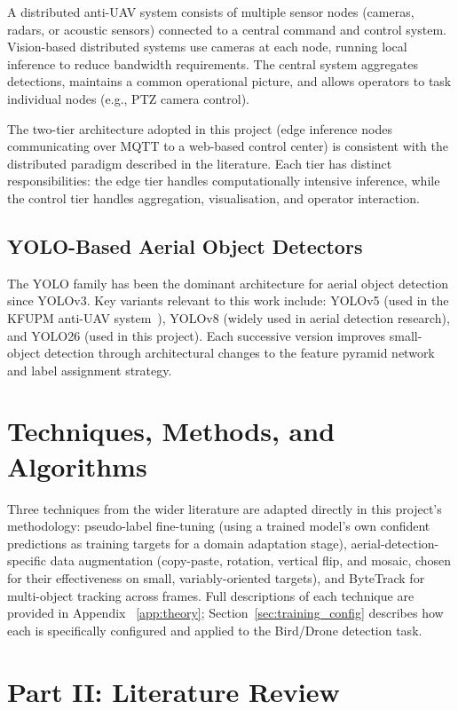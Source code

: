 \documentclass[12pt,a4paper]{report}
\begin{document}
A distributed anti-UAV system consists of multiple sensor nodes (cameras,
radars, or acoustic sensors) connected to a central command and control
system. Vision-based distributed systems use cameras at each node, running
local inference to reduce bandwidth requirements. The central system
aggregates detections, maintains a common operational picture, and allows
operators to task individual nodes (e.g., PTZ camera control).

The two-tier architecture adopted in this project (edge inference nodes
communicating over MQTT to a web-based control center) is consistent
with the distributed paradigm described in the literature. Each tier has
distinct responsibilities: the edge tier handles computationally intensive
inference, while the control tier handles aggregation, visualisation, and
operator interaction.

\subsection{YOLO-Based Aerial Object Detectors}

The YOLO family has been the dominant architecture for aerial object
detection since YOLOv3. Key variants relevant to this work include:
YOLOv5 (used in the KFUPM anti-UAV system~\cite{munir2023kfupm}), YOLOv8 (widely used in
aerial detection research), and YOLO26 (used in this project). Each
successive version improves small-object detection through architectural
changes to the feature pyramid network and label assignment strategy.

\section{Techniques, Methods, and Algorithms}

Three techniques from the wider literature are adapted directly in this
project's methodology: pseudo-label fine-tuning (using a trained model's
own confident predictions as training targets for a domain adaptation
stage), aerial-detection-specific data augmentation (copy-paste, rotation,
vertical flip, and mosaic, chosen for their effectiveness on small,
variably-oriented targets), and ByteTrack for multi-object tracking across
frames. Full descriptions of each technique are provided in
Appendix~
\ref{app:theory}; Section~\ref{sec:training_config} describes how each is specifically
configured and applied to the Bird/Drone detection task.

\section*{Part II: Literature Review}
\end{document}
